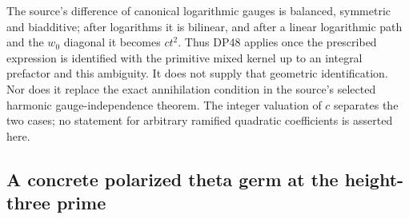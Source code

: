 \documentclass[11pt,a4paper]{article}
\theoremstyle{definition}\newtheorem{remark}[theorem]{Remark}
\begin{document}
The source's difference of canonical logarithmic gauges is balanced, symmetric and biadditive; after logarithms it is bilinear, and after a linear logarithmic path and the $w_0$ diagonal it becomes $ct^2$. Thus DP48 applies once the prescribed expression is identified with the primitive mixed kernel up to an integral prefactor and this ambiguity. It does not supply that geometric identification. Nor does it replace the exact annihilation condition in the source's selected harmonic gauge-independence theorem. The integer valuation of $c$ separates the two cases; no statement for arbitrary ramified quadratic coefficients is asserted here.


\subsection{A concrete polarized theta germ at the height-three prime}
\end{document}
